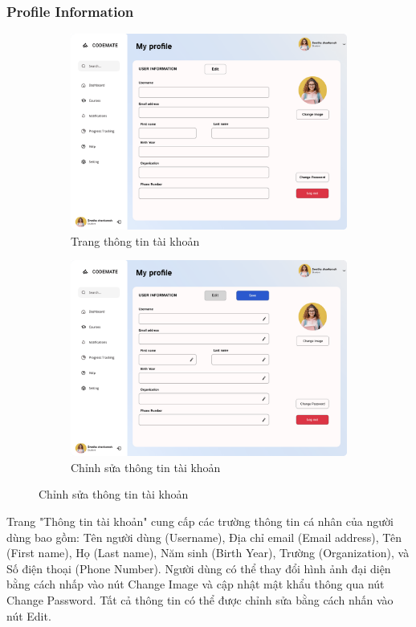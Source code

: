 \subsubsection{Profile Information}
\begin{figure}[H]
    \centering
    \begin{subfigure}[b]{0.45\linewidth}
        \centering
        \includegraphics[width=\linewidth]{Images/Anh/UI_profile.png}
        \caption{Trang thông tin tài khoản}
        \label{fig:enter-label1}
    \end{subfigure}
    \hfill
    \begin{subfigure}[b]{0.45\linewidth}
        \centering
        \includegraphics[width=\linewidth]{Images/Anh/UI_edit_profile.png}
        \caption{Chỉnh sửa thông tin tài khoản}
        \label{fig:enter-label2}
    \end{subfigure}
    \label{fig:enter-label}
\end{figure}
Trang "Thông tin tài khoản" cung cấp các trường thông tin cá nhân của người dùng bao gồm: Tên người dùng (Username), Địa chỉ email (Email address), Tên (First name), Họ (Last name), Năm sinh (Birth Year), Trường (Organization), và Số điện thoại (Phone Number). Người dùng có thể thay đổi hình ảnh đại diện bằng cách nhấp vào nút Change Image và cập nhật mật khẩu thông qua nút Change Password. Tất cả thông tin có thể được chỉnh sửa bằng cách nhấn vào nút Edit.
